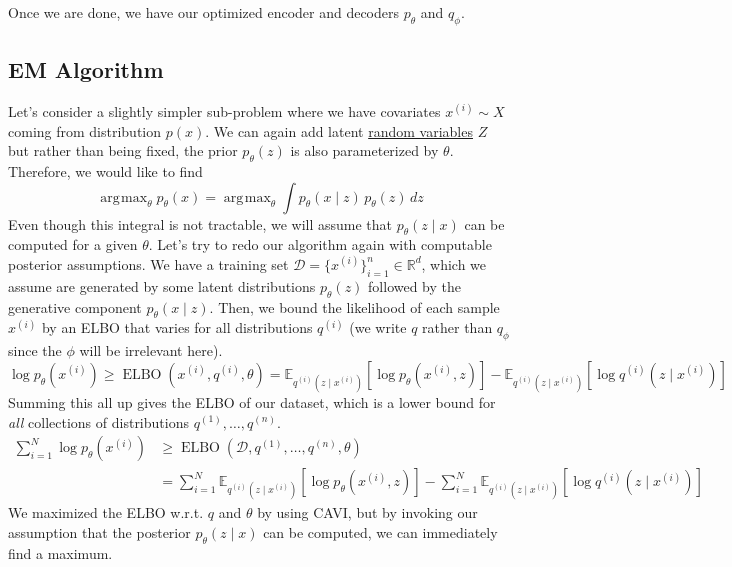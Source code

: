 \documentclass{article}
\DeclareMathOperator{\elbo}{ELBO}
\DeclareMathOperator*{\argmax}{\arg\!\max}
\begin{document}
  Once we are done, we have our optimized encoder and decoders $p_\theta$ and $q_\phi$. 

\subsection{EM Algorithm} 

  Let's consider a slightly simpler sub-problem where we have covariates $x^{(i)} \sim X$ coming from distribution $p(x)$. We can again add latent \hyperref[prob-def:random-variable]{random variables} $Z$ but rather than being fixed, the prior $p_\theta (z)$ is also parameterized by $\theta$. Therefore, we would like to find 
  \begin{equation}
    \argmax_\theta p_\theta (x) = \argmax_\theta \int p_\theta (x \mid z) \, p_\theta (z) \,dz
  \end{equation} 
  Even though this integral is not tractable, we will assume that $p_\theta (z \mid x)$ can be computed for a given $\theta$. Let's try to redo our algorithm again with computable posterior assumptions. We have a training set $\mathcal{D} = \{x^{(i)}\}_{i=1}^n \in \mathbb{R}^d$, which we assume are generated by some latent distributions $p_\theta (z)$ followed by the generative component $p_\theta (x \mid z)$. Then, we bound the likelihood of each sample $x^{(i)}$ by an ELBO that varies for all distributions $q^{(i)}$ (we write $q$ rather than $q_\phi$ since the $\phi$ will be irrelevant here). 
  \begin{equation}
    \log p_{\theta} (x^{(i)}) \geq \elbo(x^{(i)}, q^{(i)}, \theta) = \mathbb{E}_{q^{(i)} (z \mid x^{(i)})} [ \log p_{\theta} (x^{(i)}, z)] - \mathbb{E}_{q^{(i)} (z \mid x^{(i)})} [ \log q^{(i)} (z \mid x^{(i)}) ]
  \end{equation} 
  Summing this all up gives the ELBO of our dataset, which is a lower bound for \textit{all} collections of distributions $q^{(1)}, \ldots, q^{(n)}$. 
  \begin{align}
    \sum_{i=1}^N \log p_{\theta} (x^{(i)}) & \geq \elbo(\mathcal{D}, q^{(1)}, \ldots, q^{(n)}, \theta) \\ 
                                           & = \sum_{i=1}^N \mathbb{E}_{q^{(i)} (z \mid x^{(i)})} [ \log p_{\theta} (x^{(i)}, z)] - \sum_{i=1}^N \mathbb{E}_{q^{(i)} (z \mid x^{(i)})} [ \log q^{(i)} (z \mid x^{(i)}) ]
  \end{align} 
  We maximized the ELBO w.r.t. $q$ and $\theta$ by using CAVI, but by invoking our assumption that the posterior $p_\theta (z \mid x)$ can be computed, we can immediately find a maximum. 
\end{document}
